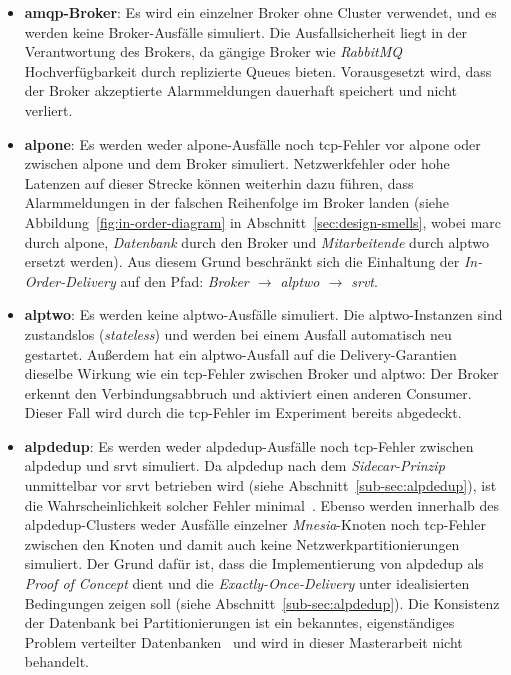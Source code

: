 \begin{itemize}
    \item \textbf{\gls{amqp}-Broker}: Es wird ein einzelner Broker ohne Cluster verwendet, und es werden keine Broker-Ausfälle simuliert. Die Ausfallsicherheit liegt in der Verantwortung des Brokers, da gängige Broker wie \textit{RabbitMQ} Hochverfügbarkeit durch replizierte Queues bieten. Vorausgesetzt wird, dass der Broker akzeptierte Alarmmeldungen dauerhaft speichert und nicht verliert.

    \item \textbf{\gls{alpone}}: Es werden weder \gls{alpone}-Ausfälle noch \gls{tcp}-Fehler vor \gls{alpone} oder zwischen \gls{alpone} und dem Broker simuliert. Netzwerkfehler oder hohe Latenzen auf dieser Strecke können weiterhin dazu führen, dass Alarmmeldungen in der falschen Reihenfolge im Broker landen (siehe Abbildung~\ref{fig:in-order-diagram} in Abschnitt~\ref{sec:design-smells}, wobei \gls{marc} durch \gls{alpone}, \textit{Datenbank} durch den Broker und \textit{Mitarbeitende} durch \gls{alptwo} ersetzt werden). Aus diesem Grund beschränkt sich die Einhaltung der \textit{In-Order-Delivery} auf den Pfad: \textit{Broker $\rightarrow$ \gls{alptwo} $\rightarrow$ \gls{srvt}}.

    \item \textbf{\gls{alptwo}}: Es werden keine \gls{alptwo}-Ausfälle simuliert. Die \gls{alptwo}-Instanzen sind zustandslos (\textit{stateless}) und werden bei einem Ausfall automatisch neu gestartet. Außerdem hat ein \gls{alptwo}-Ausfall auf die Delivery-Ga\-ran\-ti\-en dieselbe Wirkung wie ein \gls{tcp}-Fehler zwischen Broker und \gls{alptwo}: Der Broker erkennt den Verbindungsabbruch und aktiviert einen anderen Consumer. Dieser Fall wird durch die \gls{tcp}-Fehler im Experiment bereits abgedeckt.

    \item \textbf{\gls{alpdedup}}: Es werden weder \gls{alpdedup}-Ausfälle noch \gls{tcp}-Fehler zwischen \gls{alpdedup} und \gls{srvt} simuliert. Da \gls{alpdedup} nach dem \textit{Sidecar-Prinzip} unmittelbar vor \gls{srvt} betrieben wird (siehe Abschnitt~\ref{sub-sec:alpdedup}), ist die Wahrscheinlichkeit solcher Fehler minimal~\citep{burns2018designing}. Ebenso werden innerhalb des \gls{alpdedup}-Clusters weder Ausfälle einzelner \textit{Mnesia}-Knoten noch \gls{tcp}-Fehler zwischen den Knoten und damit auch keine Netzwerkpartitionierungen simuliert. Der Grund dafür ist, dass die Implementierung von \gls{alpdedup} als \textit{Proof of Concept} dient und die \textit{Exactly-Once-Delivery} unter idealisierten Bedingungen zeigen soll (siehe Abschnitt~\ref{sub-sec:alpdedup}). Die Konsistenz der Datenbank bei Partitionierungen ist ein bekanntes, eigenständiges Problem verteilter Datenbanken~\citep{gilbert2002, davidson1985} und wird in dieser Masterarbeit nicht behandelt.


\end{itemize}

